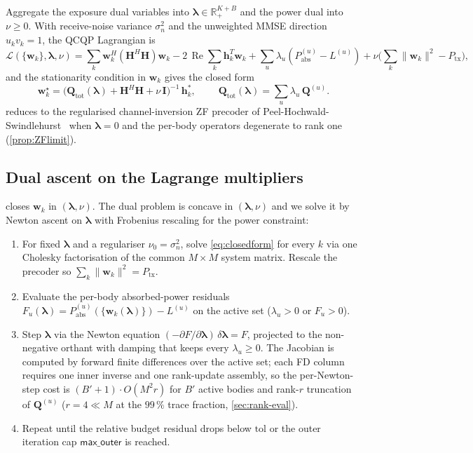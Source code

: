 \documentclass[journal,twocolumn,10pt]{IEEEtran}
\theoremstyle{plain}
\theoremstyle{remark}
\newcommand{\hh}{\mathbf{h}}
\newcommand{\ww}{\mathbf{w}}
\newcommand{\Pabs}{P_{\mathrm{abs}}}
\newcommand{\Qmat}{\mathbf{Q}}
\newcommand{\HH}{\mathbf{H}}
\newcommand{\II}{\mathbf{I}}
\DeclareMathOperator{\RE}{Re}
\begin{document}
Aggregate the exposure dual variables into $\bm\lambda \in
\mathbb{R}_+^{K+B}$ and the power dual into $\nu \geq 0$. With
receive-noise variance $\sigma_n^2$ and the unweighted MMSE
direction $u_k v_k = 1$, the QCQP Lagrangian is
\begin{equation}\label{eq:lagrangian-mmse}
  \mathcal{L}(\{\ww_k\}, \bm\lambda, \nu)
  = \sum_k \ww_k^H (\HH^H \HH)\ww_k
  - 2\,\RE \sum_k \hh_k^T \ww_k
  + \sum_u \lambda_u (\Pabs^{(u)} - L^{(u)})
  + \nu \bigl(\textstyle\sum_k \|\ww_k\|^2 - P_{\mathrm{tx}}\bigr),
\end{equation}
and the stationarity condition in $\ww_k$ gives the closed form
\begin{equation}\label{eq:closedform}
  \boxed{\;
  \ww_k^\star = \bigl(\Qmat_{\mathrm{tot}}(\bm\lambda) + \HH^H
  \HH + \nu\,\II\bigr)^{-1}\,\hh_k^*,\;}
  \qquad
  \Qmat_{\mathrm{tot}}(\bm\lambda) = \sum_u \lambda_u\,\Qmat^{(u)}.
\end{equation}
 reduces to the regularised channel-inversion
ZF precoder of Peel-Hochwald-Swindlehurst~\cite{PeelHochwald2005}
when $\bm\lambda = 0$ and the per-body operators degenerate to
rank one (\cref{prop:ZFlimit}).

\subsection*{Dual ascent on the Lagrange multipliers}

 closes $\ww_k$ in $(\bm\lambda, \nu)$. The
dual problem is concave in $(\bm\lambda, \nu)$ and we solve it by
Newton ascent on $\bm\lambda$ with Frobenius rescaling for the
power constraint:

\begin{enumerate}
\item For fixed $\bm\lambda$ and a regulariser $\nu_0 = \sigma_n^2$,
  solve \cref{eq:closedform} for every $k$ via one Cholesky
  factorisation of the common $M\times M$ system matrix. Rescale
  the precoder so $\sum_k \|\ww_k\|^2 = P_{\mathrm{tx}}$.
\item Evaluate the per-body absorbed-power residuals
  $F_u(\bm\lambda) = \Pabs^{(u)}(\{\ww_k(\bm\lambda)\}) - L^{(u)}$
  on the active set ($\lambda_u > 0$ or $F_u > 0$).
\item Step $\bm\lambda$ via the Newton equation
  $(-\partial F/\partial \bm\lambda)\,\delta\bm\lambda = F$,
  projected to the non-negative orthant with damping that keeps
  every $\lambda_u \geq 0$. The Jacobian is computed by forward
  finite differences over the active set; each FD column requires
  one inner inverse and one rank-update assembly, so the
  per-Newton-step cost is $(B' + 1)\cdot O(M^2 r)$ for $B'$ active
  bodies and rank-$r$ truncation of $\Qmat^{(u)}$ ($r = 4 \ll M$
  at the $99\,\%$ trace fraction, \cref{sec:rank-eval}).
\item Repeat until the relative budget residual drops below
  $\mathrm{tol}$ or the outer iteration cap $\textsf{max\_outer}$
  is reached.
\end{enumerate}
\end{document}
